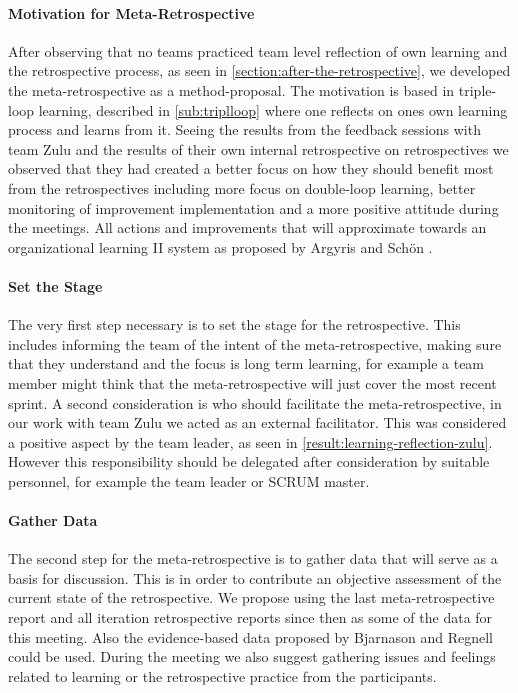 \paragraph{Motivation for Meta-Retrospective}
After observing that no teams practiced team level reflection of own learning and the retrospective process, as seen in \autoref{section:after-the-retrospective}, we developed the meta-retrospective as a method-proposal. The motivation is based in triple-loop learning, described in \autoref{sub:triplloop} where one reflects on ones own learning process and learns from it. Seeing the results from the feedback sessions with team Zulu and the results of their own internal retrospective on retrospectives we observed that they had created a better focus on how they should benefit most from the retrospectives including more focus on double-loop learning, better monitoring of improvement implementation and a more positive attitude during the meetings. All actions and improvements that will approximate towards an organizational learning II system as proposed by Argyris and Schön \cite{Argyris1996}.

\paragraph{Set the Stage}
The very first step necessary is to set the stage for the retrospective. This includes informing the team of the intent of the meta-retrospective, making sure that they understand and the focus is long term learning, for example a team member might think that the meta-retrospective will just cover the most recent sprint. A second consideration is who should facilitate the meta-retrospective, in our work with team Zulu we acted as an external facilitator. This was considered a positive aspect by the team leader, as seen in \autoref{result:learning-reflection-zulu}. However this responsibility should be delegated after consideration by suitable personnel, for example the team leader or SCRUM master. 

\paragraph{Gather Data}
The second step for the meta-retrospective is to gather data that will serve as a basis for discussion. This is in order to contribute an objective assessment of the current state of the retrospective. We propose using the last meta-retrospective report and all iteration retrospective reports since then as some of the data for this meeting. Also the evidence-based data proposed by Bjarnason and Regnell\cite{Bjarnason2012} could be used. During the meeting we also suggest gathering issues and feelings related to learning or the retrospective practice from the participants.

